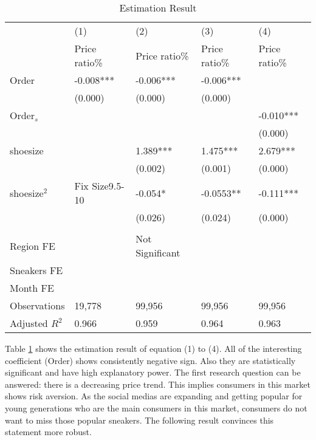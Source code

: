 \documentclass[a4paper]{article}
\theoremstyle{definition}
\theoremstyle{definition}
\theoremstyle{remark}
\begin{document}
\begin{large}
\begin{table}[H]
	\centering
	\caption{Estimation Result}
	\begin{tabular}{p{}p{}p{}p{}p{}}
		\hline \hline
		& (1) & (2) & (3) & (4)  \\
		& Price ratio\% & Price ratio\% & Price ratio\% & Price ratio\%  \\ \hline
		Order        &      -0.008***&      -0.006*** & -0.006*** & \\
		&     (0.000)   &     (0.000) & (0.000)  &    \\
		Order$_{s}$ & & & &  -0.010*** \\
		&&&& (0.000) \\[0.2cm]
		shoesize            &       &       1.389***  & 1.475***  &  2.679***\\
		&        &     (0.002) & (0.001) & (0.000)  \\
		shoesize$^{2}$         &      Fix Size9.5-10 &      -0.054* & -0.0553** & -0.111*** \\
		&        &     (0.026) & (0.024) & (0.000)   \\
		&&&&\\
		Region FE & & Not Significant & & \\
		\hline
		Sneakers FE      & \checkmark & \checkmark & \checkmark & \checkmark \\
		Month FE & \checkmark & \checkmark & \checkmark & \checkmark \\
		Observations        &      19,778  &      99,956  & 99,956 & 99,956 \\
		Adjusted $ R^{2} $  &       0.966   &   0.959 & 0.964 & 0.963  \\
		\hline\hline
	\end{tabular}
	\label{tab6:table6}
\end{table}

Table \ref{tab6:table6} shows the estimation result of equation (1) to (4). All of the interesting coefficient (Order) shows consistently negative sign. Also they are statistically significant and have high explanatory power. The first research question can be answered: there is a decreasing price trend. This implies consumers in this market shows risk aversion. As the social medias are expanding and getting popular for young generations who are the main consumers in this market, consumers do not want to miss those popular sneakers. The following result convinces this statement more robust.


\end{large}
\end{document}
